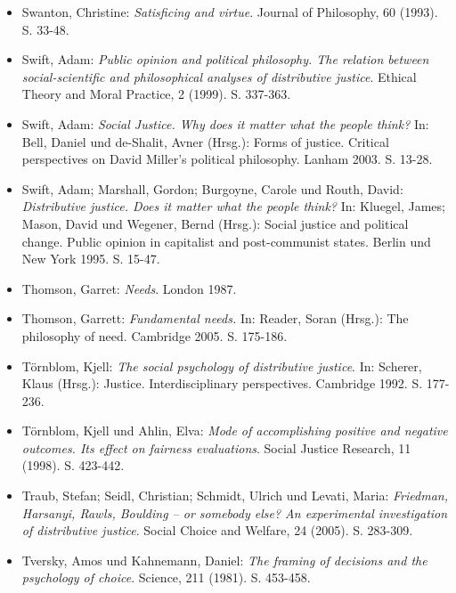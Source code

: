 \documentclass[a4paper]{thesis}
\begin{document}
\begin{itemize}[leftmargin=1.5em,label={},itemindent=-1.5em, itemsep=-1ex]
\item Swanton, Christine: \textit{Satisficing and virtue}. Journal of Philosophy, 60 (1993). S. 33-48.

\item Swift, Adam: \textit{Public opinion and political philosophy. The relation between social-scientific and philosophical analyses of distributive justice}. Ethical Theory and Moral Practice, 2 (1999). S. 337-363.

\item Swift, Adam: \textit{Social Justice. Why does it matter what the people think?} In: Bell, Daniel und de-Shalit, Avner (Hrsg.): Forms of justice. Critical perspectives on David Miller's political philosophy. Lanham 2003. S. 13-28.

\item Swift, Adam; Marshall, Gordon; Burgoyne, Carole und Routh, David: \textit{Distributive justice. Does it matter what the people think?} In: Kluegel, James; Mason, David und Wegener, Bernd (Hrsg.): Social justice and political change. Public opinion in capitalist and post-communist states. Berlin und New York 1995. S. 15-47.

\item Thomson, Garret: \textit{Needs}. London 1987.

\item Thomson, Garrett: \textit{Fundamental needs.} In: Reader, Soran (Hrsg.): The philosophy of need. Cambridge 2005. S. 175-186. 

\item Törnblom, Kjell: \textit{The social psychology of distributive justice}. In: Scherer, Klaus (Hrsg.): Justice. Interdisciplinary perspectives. Cambridge 1992. S. 177-236.

\item Törnblom, Kjell und Ahlin, Elva: \textit{Mode of accomplishing positive and negative outcomes. Its effect on fairness evaluations}. Social Justice Research, 11 (1998). S. 423-442.

\item Traub, Stefan; Seidl, Christian; Schmidt, Ulrich und Levati, Maria: \textit{Friedman, Harsanyi, Rawls, Boulding -- or somebody else? An experimental investigation of distributive justice}. Social Choice and Welfare, 24 (2005). S. 283-309.

\item Tversky, Amos und Kahnemann, Daniel: \textit{The framing of decisions and the psychology of choice}. Science, 211 (1981). S. 453-458.


\end{itemize}
\end{document}
